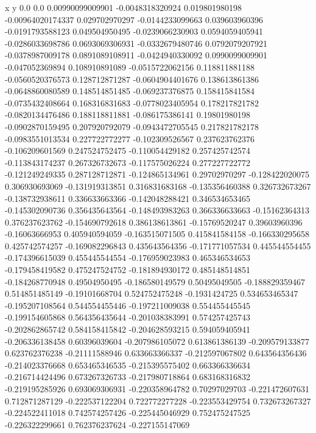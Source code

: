              x                y
            0.0              0.0
0.00990099009901  -0.0048318320924
 0.019801980198  -0.00964020174337
 0.029702970297  -0.0144233099663
 0.039603960396  -0.0191793588123
 0.049504950495  -0.0239066230903
0.0594059405941  -0.0286033698786
0.0693069306931  -0.0332679480746
0.0792079207921  -0.0378987009178
0.0891089108911  -0.0424940330092
0.0990099009901  -0.047052369894
 0.108910891089  -0.0515722062156
 0.118811881188  -0.0560520376573
 0.128712871287  -0.0604904401676
 0.138613861386  -0.0648860080589
 0.148514851485  -0.069237376875
 0.158415841584  -0.0735432408664
 0.168316831683  -0.0778023405954
 0.178217821782  -0.0820134476486
 0.188118811881  -0.086175386141
  0.19801980198  -0.0902870159495
 0.207920792079  -0.0943472705545
 0.217821782178  -0.0983551013534
 0.227722772277  -0.102309526567
 0.237623762376  -0.106209601569
 0.247524752475  -0.110054429182
 0.257425742574  -0.113843174237
 0.267326732673  -0.117575026224
 0.277227722772  -0.121249249335
 0.287128712871  -0.124865134961
  0.29702970297  -0.128422020075
 0.306930693069  -0.131919313851
 0.316831683168  -0.135356460388
 0.326732673267  -0.138732938611
 0.336633663366  -0.142048288421
 0.346534653465  -0.145302090736
 0.356435643564  -0.148493983263
 0.366336633663   -0.15162364313
 0.376237623762  -0.154690792618
 0.386138613861   -0.15769520247
  0.39603960396   -0.16063666953
 0.405940594059  -0.163515071505
 0.415841584158  -0.166330295658
 0.425742574257  -0.169082296843
 0.435643564356  -0.171771057534
 0.445544554455  -0.174396615039
 0.455445544554  -0.176959023983
 0.465346534653  -0.179458419582
 0.475247524752  -0.181894930172
 0.485148514851  -0.184268770948
  0.49504950495  -0.186580149579
  0.50495049505  -0.188829359467
 0.514851485149   -0.19101668704
 0.524752475248    -0.1931424725
 0.534653465347  -0.195207108564
 0.544554455446  -0.197211009038
 0.554455445545  -0.199154605868
 0.564356435644  -0.201038383991
 0.574257425743  -0.202862865742
 0.584158415842  -0.204628593215
 0.594059405941  -0.206336138458
  0.60396039604  -0.207986105072
 0.613861386139  -0.209579133877
 0.623762376238   -0.21111588946
 0.633663366337  -0.212597067802
 0.643564356436  -0.214023376668
 0.653465346535  -0.215395575402
 0.663366336634  -0.216714424496
 0.673267326733  -0.217980718864
 0.683168316832  -0.219195285926
 0.693069306931  -0.220358964782
  0.70297029703  -0.221472607631
 0.712871287129  -0.222537122204
 0.722772277228  -0.223553429754
 0.732673267327  -0.224522411018
 0.742574257426  -0.225445046929
 0.752475247525  -0.226322299661
 0.762376237624  -0.227155147069
